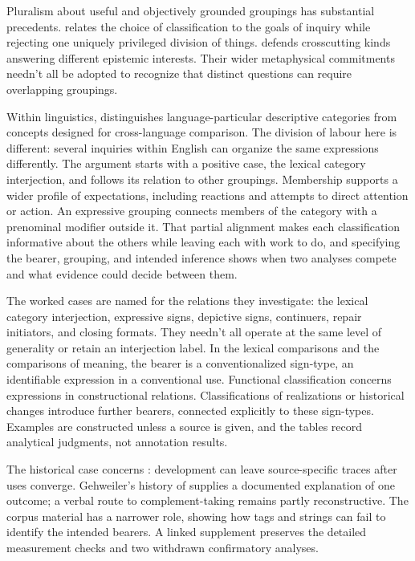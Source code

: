 \documentclass[12pt]{article}
\begin{document}
Pluralism about useful and objectively grounded groupings has substantial
precedents. \textcite[5--7, 17--18]{dupre1993disorder} relates the choice of
classification to the goals of inquiry while rejecting one uniquely
privileged division of things. \textcite[63--64, 69--72]{khalidi2013}
defends crosscutting kinds answering different epistemic interests.
Their wider metaphysical commitments needn't all be adopted to recognize
that distinct questions can require overlapping groupings.

Within linguistics, \textcite[663, 666, 680]{haspelmath2010} distinguishes
language-particular descriptive categories from concepts designed for
cross-language comparison. The division of labour here is different:
several inquiries within English can organize the same expressions
differently. The argument starts with a positive case, the lexical
category interjection, and follows its relation to other groupings.
Membership supports a wider profile of expectations, including reactions
and attempts to direct attention or action. An expressive grouping connects
members of the category with a prenominal modifier outside it. That partial
alignment makes each classification informative about the others while
leaving each with work to do, and specifying the bearer, grouping, and
intended inference shows when two analyses compete and what evidence could
decide between them.

The worked cases are named for the relations they investigate: the
lexical category interjection, expressive signs, depictive signs, continuers, repair
initiators, and closing formats. They needn't all operate at the same level
of generality or retain an interjection label. In the lexical comparisons
and the comparisons of meaning, the bearer is a conventionalized sign-type,
an identifiable expression in a conventional use. Functional classification
concerns expressions in constructional relations. Classifications of
realizations or historical changes introduce further bearers, connected
explicitly to these sign-types. Examples are constructed unless a source is
given, and the tables record analytical judgments, not annotation results.

The historical case concerns : development can leave
source-specific traces after uses converge. Gehweiler's history of
 supplies a documented explanation of one outcome; a verbal
route to complement-taking  remains partly reconstructive.
The corpus material has a narrower role, showing how tags and strings
can fail to identify the intended bearers. A linked supplement preserves
the detailed measurement checks and two withdrawn confirmatory analyses.
\end{document}
